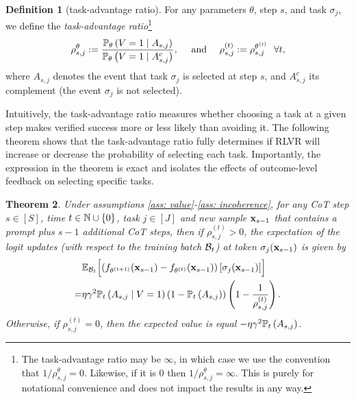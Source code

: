\documentclass{article}
\theoremstyle{plain}
\newtheorem{theorem}{Theorem}[section]
\theoremstyle{definition}
\newtheorem{definition}[theorem]{Definition}
\theoremstyle{remark}
\begin{document}
\begin{definition}[task-advantage ratio]\label{def: advantage}
For any parameters $\theta$, step $s$, and task $\sigma_j$, we define the \emph{task-advantage ratio}\footnote{The task-advantage ratio may be $\infty$, in which case we use the convention that $1/\rho^{\theta}_{s,j}=0$. Likewise, if it is $0$ then $1/\rho^{\theta}_{s,j}=\infty$. This is purely for notational convenience and does not impact the results in any way.}
\begin{align*}
    \rho^{\theta}_{s,j}:=
    \frac{\P_{\theta} \left(V=1 \mid A_{s,j}\right)}{\P_{\theta} \left(V=1 \mid A_{s,j}^c\right)}, \quad \text{ and } \quad \rho^{(t)}_{s,j}:= \rho^{\theta^{(t)}}_{s,j} ~~ \forall t,
\end{align*}
where $A_{s,j}$ denotes the event that task $\sigma_j$ is selected at step $s$, and $A_{s,j}^c$ its complement (the event $\sigma_j$ is not selected).
\end{definition}

Intuitively, the task-advantage ratio measures whether choosing a task at a given step makes verified success more or less likely than avoiding it. The following theorem shows that the task-advantage ratio fully determines if RLVR will increase or decrease the probability of selecting each task. Importantly, the expression in the theorem is exact and isolates the effects of outcome-level feedback on selecting specific tasks.

\begin{theorem}\label{thm:exp_updates_main}
    Under assumptions \ref{ass: value}-\ref{ass: incoherence}, for any CoT step $s\in[S]$, time $t \in \N \cup \{0\}$, task $j\in[J]$ and new sample $\bx_{s-1}$ that contains a prompt plus $s-1$ additional CoT steps, then if $\rho_{s, j}^{(t)} > 0$, the expectation of the logit updates (with respect to the training batch $\Bcal_t$) at token $\sigma_j(\bx_{s-1})$ is given by 
    \begin{align*}
        & \E_{\Bcal_t}\Bigl[\left(f_{\theta^{(t+1)}}(\bx_{s-1}) - f_{\theta^{(t)}}(\bx_{s-1})\right)[\sigma_j(\bx_{s-1})]\Bigr] \\ 
        = & \eta \gamma^2 \P_t\left(A_{s,j} \mid V=1\right)\left(1 - \P_t\left(A_{s,j}\right)\right)\left(1 - \frac{1}{\rho_{s, j}^{(t)}}\right).
    \end{align*}
    Otherwise, if $\rho_{s, j}^{(t)} = 0$, then the expected value is equal $- \eta \gamma^2\P_t\left(A_{s,j}\right)$.
\end{theorem}
\end{document}
